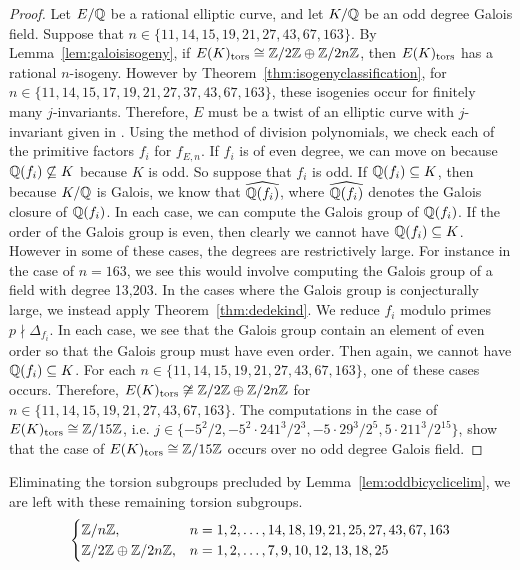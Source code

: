 \begin{proof}
Let $E/\mathbb{Q}$ be a rational elliptic curve, and let $K/\mathbb{Q}$ be an odd degree Galois field. Suppose that $n \in \{ 11, 14, 15, 19, 21, 27, 43, 67, 163 \}$. By Lemma~\ref{lem:galoisisogeny}, if $E(K)_{\text{tors}} \cong \mathbb{Z}/2\mathbb{Z} \oplus \mathbb{Z}/2n\mathbb{Z}$, then $E(K)_{\text{tors}}$ has a rational $n$-isogeny. However by Theorem~\ref{thm:isogenyclassification}, for $n \in \{ 11, 14, 15, 17, 19, 21, 27, 37, 43, 67, 163 \}$, these isogenies occur for finitely many $j$-invariants. Therefore, $E$ must be a twist of an elliptic curve with $j$-invariant given in \cite[Table~4]{lozanorobledo13}. Using the method of division polynomials, we check each of the primitive factors $f_i$ for $f_{E,n}$. If $f_i$ is of even degree, we can move on because $\mathbb{Q}(f_i) \not\subseteq K$ because $K$ is odd. So suppose that $f_i$ is odd. If $\mathbb{Q}(f_i) \subseteq K$, then because $K/\mathbb{Q}$ is Galois, we know that $\widehat{\mathbb{Q}(f_i)}$, where $\widehat{\mathbb{Q}(f_i)}$ denotes the Galois closure of $\mathbb{Q}(f_i)$. In each case, we can compute the Galois group of $\mathbb{Q}(f_i)$. If the order of the Galois group is even, then clearly we cannot have $\mathbb{Q}(f_i) \subseteq K$. However in some of these cases, the degrees are restrictively large. For instance in the case of $n= 163$, we see this would involve computing the Galois group of a field with degree 13,203. In the cases where the Galois group is conjecturally large, we instead apply Theorem~\ref{thm:dedekind}. We reduce $f_i$ modulo primes $p \nmid \Delta_{f_i}$. In each case, we see that the Galois group contain an element of even order so that the Galois group must have even order. Then again, we cannot have $\mathbb{Q}(f_i) \subseteq K$. For each $n \in \{ 11, 14, 15, 19, 21, 27, 43, 67, 163 \}$, one of these cases occurs. Therefore, $E(K)_{\text{tors}} \not\cong \mathbb{Z}/2\mathbb{Z} \oplus \mathbb{Z}/2n\mathbb{Z}$ for $n \in \{ 11, 14, 15, 19, 21, 27, 43, 67, 163 \}$. The computations in the case of $E(K)_{\text{tors}} \cong \mathbb{Z}/15\mathbb{Z}$, i.e. $j \in \{ -5^2/2, -5^2 \cdot 241^3/2^3, -5 \cdot 29^3/2^5, 5 \cdot 211^3/2^{15} \}$, show that the case of $E(K)_{\text{tors}} \cong \mathbb{Z}/15\mathbb{Z}$ occurs over no odd degree Galois field. 
\end{proof}


Eliminating the torsion subgroups precluded by Lemma~\ref{lem:oddbicyclicelim}, we are left with these remaining torsion subgroups. 
	\[
	\begin{cases}
	\mathbb{Z}/n\mathbb{Z}, & n= 1, 2, \ldots, 14, 18, 19, 21, 25, 27, 43, 67, 163 \\
	\mathbb{Z}/2\mathbb{Z} \oplus \mathbb{Z}/2n\mathbb{Z}, & n= 1, 2, \ldots, 7, 9, 10, 12, 13, 18, 25
	\end{cases}
	\]


